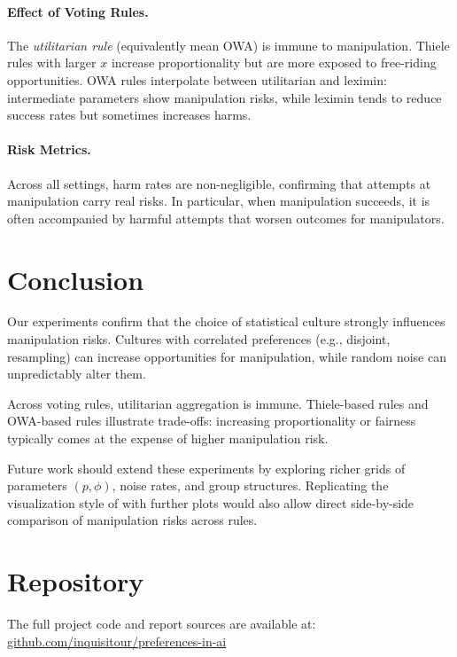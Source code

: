 \documentclass[11pt]{article}
\begin{document}
\paragraph{Effect of Voting Rules.}
The \emph{utilitarian rule} (equivalently mean OWA) is immune to manipulation.
Thiele rules with larger $x$ increase proportionality but are more exposed to
free-riding opportunities. OWA rules interpolate between utilitarian and
leximin: intermediate parameters show manipulation risks, while leximin tends
to reduce success rates but sometimes increases harms.

\paragraph{Risk Metrics.}
Across all settings, harm rates are non-negligible, confirming that attempts at
manipulation carry real risks. In particular, when manipulation succeeds, it is
often accompanied by harmful attempts that worsen outcomes for manipulators.

\section{Conclusion}
Our experiments confirm that the choice of statistical culture strongly
influences manipulation risks. Cultures with correlated preferences (e.g.,
disjoint, resampling) can increase opportunities for manipulation, while random
noise can unpredictably alter them. 

Across voting rules, utilitarian aggregation is immune. Thiele-based rules and
OWA-based rules illustrate trade-offs: increasing proportionality or fairness
typically comes at the expense of higher manipulation risk.

Future work should extend these experiments by exploring richer grids of
parameters $(p,\phi)$, noise rates, and group structures. Replicating the
visualization style of \cite{lackner2023freeriding} with further plots would
also allow direct side-by-side comparison of manipulation risks across rules.

\section*{Repository}
The full project code and report sources are available at: \\
\href{https://github.com/inquisitour/preferences-in-ai}{github.com/inquisitour/preferences-in-ai}



\end{document}
